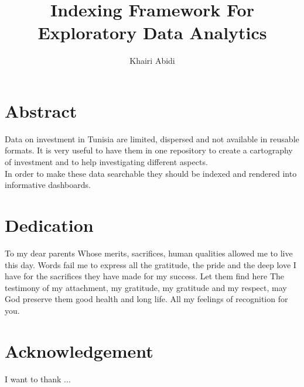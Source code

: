 \documentclass[titlepage]{report}
\begin{document}
\title{Indexing Framework For Exploratory Data Analytics}
\author{Khairi Abidi}
\maketitle

\tableofcontents
\listoffigures

\chapter*{Abstract}
\begin{center}

Data on investment in Tunisia are limited, dispersed and not available in reusable formats. It
is very useful to have them in one repository to create a cartography of investment and to
help investigating different aspects. \\
In order to make these data searchable they should be indexed and rendered into informative dashboards.
\end{center}

\chapter*{Dedication}
\begin{center}
    To my dear parents Whose merits, sacrifices, human qualities allowed me to live this day. Words fail me to express all the gratitude, the pride and the
    deep love I have for the sacrifices they have made for my success.
    Let them find here The testimony of my attachment, my gratitude, my gratitude
    and my respect, may God preserve them good health and long life. All my feelings of recognition for you.
\end{center}

\chapter*{Acknowledgement}
\begin{center}
    I want to thank ...
\end{center}







\end{document}
